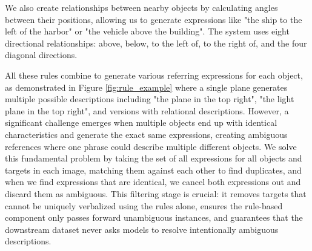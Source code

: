 \documentclass[journal]{IEEEtran}
\begin{document}
We also create relationships between nearby objects by calculating angles between their positions, allowing us to generate expressions like "the ship to the left of the harbor" or "the vehicle above the building". The system uses eight directional relationships: above, below, to the left of, to the right of, and the four diagonal directions.

All these rules combine to generate various referring expressions for each object, as demonstrated in Figure \ref{fig:rule_example} where a single plane generates multiple possible descriptions including "the plane in the top right", "the light plane in the top right", and versions with relational descriptions. However, a significant challenge emerges when multiple objects end up with identical characteristics and generate the exact same expressions, creating ambiguous references where one phrase could describe multiple different objects. We solve this fundamental problem by taking the set of all expressions for all objects and targets in each image, matching them against each other to find duplicates, and when we find expressions that are identical, we cancel both expressions out and discard them as ambiguous. This filtering stage is crucial: it removes targets that cannot be uniquely verbalized using the rules alone, ensures the rule-based component only passes forward unambiguous instances, and guarantees that the downstream dataset never asks models to resolve intentionally ambiguous descriptions.
\end{document}
